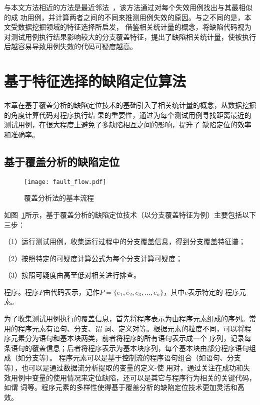 与本文方法相近的方法是最近邻法~\cite{renieres2003fault}，该方法通过对每个失效用例找出与其最相似的成
功用例，并计算两者之间的不同来推测用例失效的原因。与之不同的是，本文受数据挖掘领域的特征选择所启发，
借鉴相关统计量的概念，将缺陷代码视为对测试用例执行结果影响较大的分支覆盖特征，提出了缺陷相关统计量，使被执行
后越容易导致用例失效的代码可疑度越高。

\section{基于特征选择的缺陷定位算法}
本章在基于覆盖分析的缺陷定位技术的基础引入了相关统计量的概念，从数据挖掘的角度计算代码对程序执行结
果的重要性，通过为每个测试用例寻找距离最近的测试用例，在很大程度上避免了多缺陷相互之间的影响，提升了
缺陷定位的效率和准确率。

\subsection{基于覆盖分析的缺陷定位}
\begin{figure}[htp]
      \centering
      \texttt{[image: fault\_flow.pdf]}
      \caption{覆盖分析法的基本流程}
      \label{fig:fault_flow}
\end{figure}

如图~\ref{fig:fault_flow}所示，基于覆盖分析的缺陷定位技术（以分支覆盖特征为例）主要包括以下三步：

（1）运行测试用例，收集运行过程中的分支覆盖信息，得到分支覆盖特征谱；

（2）按照特定的可疑度计算公式为每个分支计算可疑度；

（3）按照可疑度由高至低对相关进行排查。 

\begin{Definition}
      程序。程序$P$由代码表示，记作$P=\{e_1, e_2, e_3, ..., e_n\}$，其中$e$表示特定的
      程序元素。
\end{Definition}

为了收集测试用例执行的覆盖信息，首先将程序表示为由程序元素组成的序列。常用的程序元素有语句、分支、谓
词、定义对等。根据元素的粒度不同，可以将程序元素分为语句和基本块两类，前者将程序的所有语句表示成一个
序列，记录每条语句的覆盖信息；后者将程序表示为基本块序列，每个基本块由部分程序语句组成（如分支等）。
程序元素可以是基于控制流的程序语句组合（如语句、分支等），也可以是通过数据流分析提取的变量的定义-使
用对，通过关注在成功和失效用例中变量的使用情况来定位缺陷，还可以是其它与程序行为相关的关键代码，如谓
词等。程序元素的多样性使得基于覆盖分析的缺陷定位技术更加灵活和高效。

